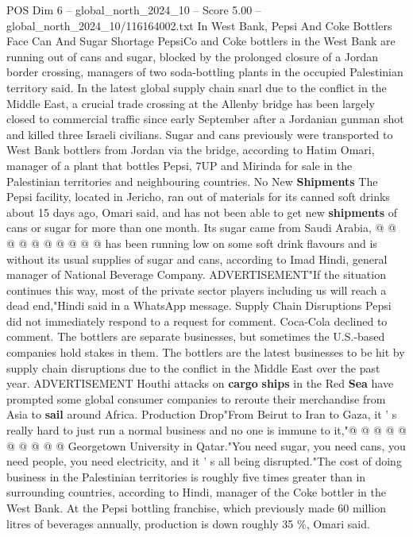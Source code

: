 \begin{textsample}{POS Dim 6 – global\_north\_2024\_10 – Score 5.00 – global\_north\_2024\_10/116164002.txt}  \label{ex:f6_pos_396}
In West Bank, Pepsi And Coke Bottlers Face Can And Sugar Shortage PepsiCo and Coke bottlers in the West Bank are running out of cans and sugar, blocked by the prolonged closure of a Jordan border crossing, managers of two soda-bottling plants in the occupied Palestinian territory said.
In the latest global supply chain snarl due to the conflict in the Middle East, a crucial trade crossing at the Allenby bridge has been largely closed to commercial traffic since early September after a Jordanian gunman shot and killed three Israeli civilians.
Sugar and cans previously were transported to West Bank bottlers from Jordan via the bridge, according to Hatim Omari, manager of a plant that bottles Pepsi, 7UP and Mirinda for sale in the Palestinian territories and neighbouring countries.
No New \textbf{Shipments} The Pepsi facility, located in Jericho, ran out of materials for its canned soft drinks about 15 days ago, Omari said, and has not been able to get new \textbf{shipments} of cans or sugar for more than one month.
Its sugar came from Saudi Arabia, @ @ @ @ @ @ @ @ @ @ has been running low on some soft drink flavours and is without its usual supplies of sugar and cans, according to Imad Hindi, general manager of National Beverage Company.
ADVERTISEMENT"If the situation continues this way, most of the private sector players including us will reach a dead end,"Hindi said in a WhatsApp message.
Supply Chain Disruptions Pepsi did not immediately respond to a request for comment.
Coca-Cola declined to comment.
The bottlers are separate businesses, but sometimes the U.S.-based companies hold stakes in them.
The bottlers are the latest businesses to be hit by supply chain disruptions due to the conflict in the Middle East over the past year.
ADVERTISEMENT Houthi attacks on \textbf{cargo} \textbf{ships} in the Red \textbf{Sea} have prompted some global consumer companies to reroute their merchandise from Asia to \textbf{sail} around Africa.
Production Drop"From Beirut to Iran to Gaza, it ' s really hard to just run a normal business and no one is immune to it,"@ @ @ @ @ @ @ @ @ @ Georgetown University in Qatar."You need sugar, you need cans, you need people, you need electricity, and it ' s all being disrupted."The cost of doing business in the Palestinian territories is roughly five times greater than in surrounding countries, according to Hindi, manager of the Coke bottler in the West Bank.
At the Pepsi bottling franchise, which previously made 60 million litres of beverages annually, production is down roughly 35 \%, Omari said.

\end{textsample}
